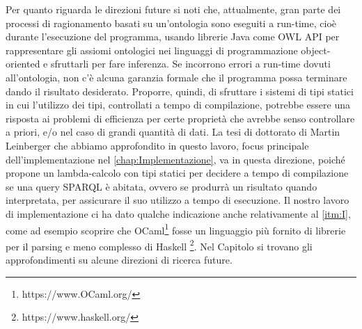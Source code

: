 Per quanto riguarda le direzioni future si noti che, attualmente, gran parte dei processi di ragionamento basati su un'ontologia sono eseguiti a run-time, cioè durante l'esecuzione del programma, usando librerie Java come OWL API \cite{OWLAPI} per rappresentare gli assiomi ontologici nei linguaggi di programmazione object-oriented e sfruttarli per fare inferenza. Se incorrono errori a run-time dovuti all'ontologia, non c'è alcuna garanzia formale che il programma possa terminare dando il risultato desiderato. Proporre, quindi, di sfruttare i sistemi di tipi statici in cui l'utilizzo dei tipi, controllati a tempo di compilazione, potrebbe essere una risposta ai problemi di efficienza per certe proprietà che avrebbe senso controllare a priori, e/o nel caso di grandi quantità di dati. La tesi di dottorato di Martin Leinberger \cite{leinbergerphdthesis} che abbiamo approfondito in questo lavoro, focus principale dell'implementazione nel \autoref{chap:Implementazione}, va in questa direzione, poiché propone un lambda-calcolo con tipi statici per decidere a tempo di compilazione se una query SPARQL è abitata, ovvero se produrrà un risultato quando interpretata, per assicurare il suo utilizzo a tempo di esecuzione. Il nostro lavoro di implementazione ci ha dato qualche indicazione anche relativamente al \autoref{itm:I}, come ad esempio scoprire che OCaml\footnote{https://www.OCaml.org/} fosse un linguaggio più fornito di librerie per il parsing e meno complesso di Haskell \footnote{https://www.haskell.org/}. Nel Capitolo %
si trovano gli approfondimenti su alcune direzioni di ricerca future.

